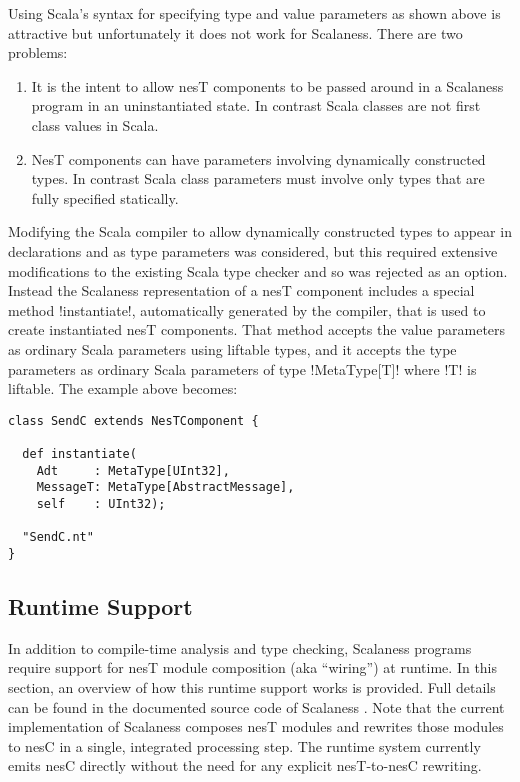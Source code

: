 Using Scala's syntax for specifying type and value parameters as shown above is attractive but
unfortunately it does not work for Scalaness. There are two problems:
\begin{enumerate}
\item It is the intent to allow nesT components to be passed around in a Scalaness program in an
  uninstantiated state. In contrast Scala classes are not first class values in Scala.
\item NesT components can have parameters involving dynamically constructed types. In contrast
  Scala class parameters must involve only types that are fully specified statically.
\end{enumerate}

Modifying the Scala compiler to allow dynamically constructed types to appear in declarations
and as type parameters was considered, but this required extensive modifications to the existing
Scala type checker and so was rejected as an option. Instead the Scalaness representation of a
nesT component includes a special method !instantiate!, automatically generated by the compiler,
that is used to create instantiated nesT components. That method accepts the value parameters as
ordinary Scala parameters using liftable types, and it accepts the type parameters as ordinary
Scala parameters of type !MetaType[T]! where !T! is liftable. The example above becomes:

\singlespace
\vspace{1.0ex}
\begin{lstlisting}[language=scalaness]
class SendC extends NesTComponent {

  def instantiate(
    Adt     : MetaType[UInt32],
    MessageT: MetaType[AbstractMessage],
    self    : UInt32);

  "SendC.nt"
}
\end{lstlisting}
\vspace{1.0ex}
\primaryspacing


\subsection{Runtime Support}
\label{section-runtime-support}

In addition to compile-time analysis and type checking, Scalaness programs require support for
nesT module composition (aka ``wiring'') at runtime. In this section, an overview of how
this runtime support works is provided. Full details can be found in the documented source code of Scalaness
\cite{scalaness-home}. Note that the current implementation of Scalaness composes nesT modules
and rewrites those modules to nesC in a single, integrated processing step. The runtime system
currently emits nesC directly without the need for any explicit nesT-to-nesC rewriting.

